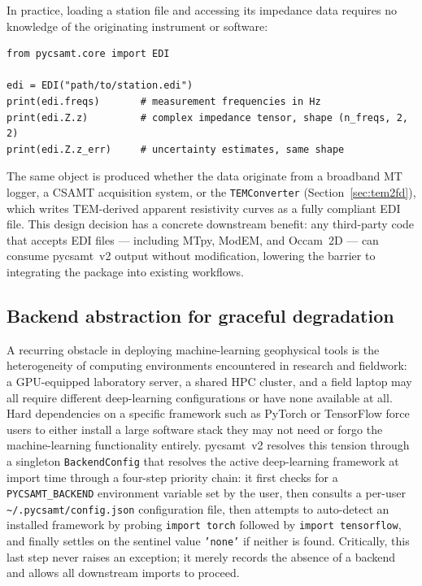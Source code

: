 \documentclass[review,12pt]{elsarticle}
\begin{document}
In practice, loading a station file and accessing its impedance data
requires no knowledge of the originating instrument or software:

\begin{lstlisting}[style=pycode, caption={Loading an EDI file and accessing impedance data.}]
from pycsamt.core import EDI

edi = EDI("path/to/station.edi")
print(edi.freqs)       # measurement frequencies in Hz
print(edi.Z.z)         # complex impedance tensor, shape (n_freqs, 2, 2)
print(edi.Z.z_err)     # uncertainty estimates, same shape
\end{lstlisting}

The same object is produced whether the data originate from a broadband MT
logger, a CSAMT acquisition system, or the \texttt{TEMConverter}
(Section~\ref{sec:tem2fd}), which writes TEM-derived apparent resistivity
curves as a fully compliant EDI file.
This design decision has a concrete downstream benefit: any third-party code
that accepts EDI files — including MTpy, ModEM, and Occam~2D — can consume
pycsamt~v2 output without modification, lowering the barrier to integrating
the package into existing workflows.

\subsection{Backend abstraction for graceful degradation}
\label{sec:backends}

A recurring obstacle in deploying machine-learning geophysical tools is
the heterogeneity of computing environments encountered in research and
fieldwork: a GPU-equipped laboratory server, a shared HPC cluster, and a
field laptop may all require different deep-learning configurations or have
none available at all.
Hard dependencies on a specific framework such as PyTorch or TensorFlow
force users to either install a large software stack they may not need or
forgo the machine-learning functionality entirely.
pycsamt~v2 resolves this tension through a singleton \texttt{BackendConfig}
that resolves the active deep-learning framework at import time through a
four-step priority chain: it first checks for a \texttt{PYCSAMT\_BACKEND}
environment variable set by the user, then consults a per-user
\texttt{\textasciitilde/.pycsamt/config.json} configuration file, then
attempts to auto-detect an installed framework by probing
\texttt{import~torch} followed by \texttt{import~tensorflow}, and finally
settles on the sentinel value \texttt{'none'} if neither is found.
Critically, this last step never raises an exception; it merely records the
absence of a backend and allows all downstream imports to proceed.
\end{document}
